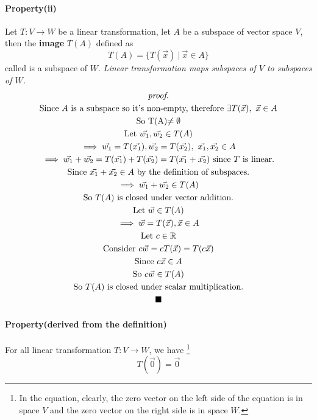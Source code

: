 \documentclass[11pt]{article}
\begin{document}
	\paragraph{Property(ii)} Let $T: V \to W$ be a linear transformation, let $A$ be a subspace of vector space $V$, then the \textbf{image} $T(A)$ defined as 
	\[
		T(A) = \{T(\vec{x})\ \vert\ \vec{x} \in A\}
	\]
	called  is a subspace of $W$.
	\emph{Linear transformation maps subspaces of $V$ to subspaces of $W$.}
	\newpage
	\begin{multline*}
	\emph{proof.} \\
		\text{Since $A$ is a subspace so it's non-empty, therefore } \exists T(\vec{x}),\ \vec{x} \in A \\
		\text{So } $T(A)$ \neq \emptyset \\
		\text{Let } \vec{w_1}, \vec{w_2} \in T(A)\\
		\implies \vec{w_1} = T(\vec{x_1}), \vec{w_2} = T(\vec{x_2}),\ \vec{x_1}, \vec{x_2} \in A \\
		\implies \vec{w_1} + \vec{w_2} = T(\vec{x_1}) + T(\vec{x_2}) = T(\vec{x_1} + \vec{x_2}) \text{ since $T$ is linear.} \\
		\text{Since } \vec{x_1} + \vec{x_2} \in A \text{ by the definition of subspaces.} \\
		\implies \vec{w_1} + \vec{w_2} \in T(A) \\
		\text{So $T(A)$ is closed under vector addition.} \\
		\text{Let } \vec{w} \in T(A) \\
		\implies \vec{w} = T(\vec{x}), \vec{x} \in A \\
		\text{Let } c \in \mathbb{R} \\
		\text{Consider } c\vec{w} = cT(\vec{x}) = T(c\vec{x}) \\
		\text{Since } c\vec{x} \in A \\
		\text{So } c\vec{w} \in T(A) \\
		\text{So $T(A)$ is closed under scalar multiplication.} \\
		\blacksquare
	\end{multline*}
	
	
	\paragraph{Property(derived from the definition)} For all linear transformation $T:V \to W$, we have \footnote{In the equation, clearly, the zero vector on the left side of the equation is in space $V$ and the zero vector on the right side is in space $W$.}
	\[
		T(\vec{0}) = \vec{0}
	\]
	
\end{document}
